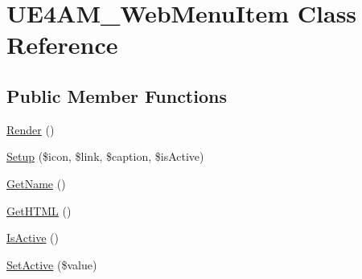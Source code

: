 \hypertarget{class_u_e4_a_m___web_menu_item}{\section{U\-E4\-A\-M\-\_\-\-Web\-Menu\-Item Class Reference}
\label{class_u_e4_a_m___web_menu_item}
}
\subsection*{Public Member Functions}
\begin{DoxyCompactItemize}
\item 
\hyperlink{class_u_e4_a_m___web_menu_item_a1a6915de89093bc6383d7c1f18ab81e2}{Render} ()
\item 
\hyperlink{class_u_e4_a_m___web_menu_item_a40d45f734dadcfe2e4386f781f82751b}{Setup} (\$icon, \$link, \$caption, \$is\-Active)
\item 
\hyperlink{class_u_e4_a_m___web_menu_item_a682caeaf9d3a25116efd75d5f00fe3c3}{Get\-Name} ()
\item 
\hyperlink{class_u_e4_a_m___web_menu_item_abc99f9ea27a455eed49d783d5e03c4ad}{Get\-H\-T\-M\-L} ()
\item 
\hyperlink{class_u_e4_a_m___web_menu_item_ae61e40709cd4b303131a1ca6bf67f482}{Is\-Active} ()
\item 
\hyperlink{class_u_e4_a_m___web_menu_item_ac647951ec24859a10ea12a36b17088dc}{Set\-Active} (\$value)
\end{DoxyCompactItemize}


